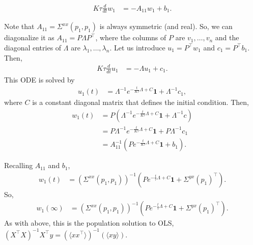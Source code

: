 \documentclass{article}
\begin{document}
\begin{align}
  K \tau \frac{d}{dt} w_1 &= - A_{11} w_1 + b_1.
\end{align}

Note that $A_{11} = \Sigma^{xx}(p_1, p_1)$ is always symmetric (and real).
So, we can diagonalize it as $A_{11} = P \Lambda P^\top$, where the columns of $P$ are $v_1, \ldots, v_n$ and the diagonal entries of $\Lambda$ are $\lambda_1, \ldots, \lambda_n$.
Let us introduce $u_1 = P^\top w_1$ and $c_1 = P^\top b_1$.
Then,
\begin{align}
  K \tau \frac{d}{dt} u_1 &= - \Lambda u_1 + c_1. \label{eq:grad_flow_exclusive_reparam}
\end{align}
This ODE is solved by
\begin{align}
  u_1(t) &= \Lambda^{-1} e^{ -\frac{t}{K \tau} \Lambda + C } \mathbf{1} + \Lambda^{-1} c_1,
\end{align}
where $C$ is a constant diagonal matrix that defines the initial condition.
Then,
\begin{align}
  w_1(t) &= P \left( \Lambda^{-1} e^{ -\frac{t}{K \tau} \Lambda + C } \mathbf{1} + \Lambda^{-1} c \right) \\
  &= P \Lambda^{-1} e^{ -\frac{t}{K \tau} \Lambda + C } \mathbf{1} + P \Lambda^{-1} c_1 \\
  &= A_{11}^{-1} \left( P e^{ -\frac{t}{K \tau} \Lambda + C } \mathbf{1} + b_1 \right).
\end{align}

Recalling $A_{11}$ and $b_1$,
\begin{align}
  w_1(t) &= ( \Sigma^{xx}(p_1,p_1) )^{-1} \left( P e^{ -\frac{t}{\tau} \Lambda + C } \mathbf{1} + \Sigma^{yx}(p_1)^\top \right).
\end{align}
So,
\begin{align}
  w_1(\infty) &= ( \Sigma^{xx}(p_1,p_1) )^{-1} \left( P e^{ -\frac{t}{\tau} \Lambda + C } \mathbf{1} + \Sigma^{yx}(p_1)^\top \right).
\end{align}
As with above, this is the population solution to OLS, $(X^\top X)^{-1} X^\top y = ( \langle x x^\top \rangle )^{-1} ( \langle x y \rangle )$.
\end{document}
